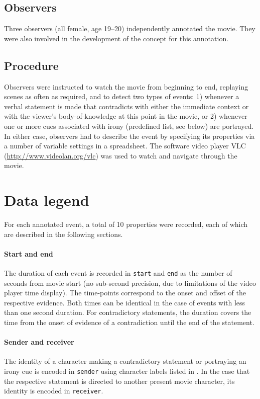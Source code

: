 \documentclass[10pt,a4paper]{article}
\begin{document}
\subsection*{Observers}

Three observers (all female, age 19–20) independently annotated the movie. They
were also involved in the development of the concept for this annotation.

\subsection*{Procedure}

Observers were instructed to watch the movie from beginning to end, replaying
scenes as often as required, and to detect two types of events: 1) whenever a
verbal statement is made that contradicts with either the immediate context or
with the viewer's body-of-knowledge at this point in the movie, or 2) whenever
one or more cues associated with irony (predefined list, see below) are
portrayed. In either case, observers had to describe the event by specifying its
properties via a number of variable settings in a spreadsheet. The software
video player VLC (\url{http://www.videolan.org/vlc}) was used to watch and
navigate through the movie.


\section*{Data legend}

For each annotated event, a total of 10 properties were recorded, each of which
are described in the following sections.

\paragraph{Start and end} The duration of each event is recorded in
\texttt{start} and \texttt{end} as the number of seconds from movie start (no
sub-second precision, due to limitations of the video player time display). The
time-points correspond to the onset and offset of the respective evidence. Both
times can be identical in the case of events with less than one second duration.
For contradictory statements, the duration covers the time from the onset of
evidence of a contradiction until the end of the statement.

\paragraph{Sender and receiver} The identity of a character making a
contradictory statement or portraying an irony cue is encoded in
\texttt{sender} using character labels listed in \citep{LRS+2015}.
In the case that the respective statement is directed to another present movie
character, its identity is encoded in \texttt{receiver}.
\end{document}
